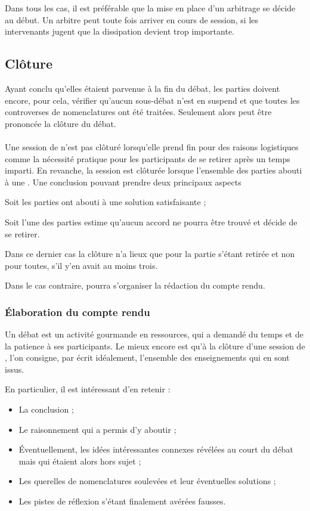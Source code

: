 Dans tous les cas, il est préférable que la mise en place d’un arbitrage se décide au début. Un arbitre peut toute fois arriver en cours de session, si les intervenants jugent que la dissipation devient trop importante.

\subsection{Clôture}

Ayant conclu qu’elles étaient parvenue à la fin du débat, les parties doivent encore, pour cela, vérifier qu’aucun sous-débat n’est en suspend et que toutes les controverses de nomenclatures ont été traitées. Seulement alors peut être prononcée la clôture du débat.

\paragraph{}
Une session de \mainabbr{} n’est pas clôturé lorsqu’elle prend fin pour des raisons logistiques comme la nécessité pratique pour les participants de se retirer après un temps imparti. En revanche, la session est clôturée lorsque l’ensemble des parties abouti à une . Une conclusion pouvant prendre deux principaux aspects
\begin{SRlist}
  \item Soit les parties ont abouti à une solution satisfaisante ;
  \item Soit l’une des parties estime qu’aucun accord ne pourra être trouvé et décide de se retirer.
\end{SRlist}
Dans ce dernier cas la clôture n’a lieux que pour la partie s’étant retirée et non pour toutes, s’il y’en avait au moins trois.

Dans le cas contraire, pourra s’organiser la rédaction du compte rendu.

\subsubsection{Élaboration du compte rendu}
Un débat est un activité gourmande en ressources, qui a demandé du temps et de la patience à ses participants. Le mieux encore est qu’à la clôture d’une session de \mainabbr{}, l’on consigne, par écrit idéalement, l’ensemble des enseignements qui en sont issus.

En particulier, il est intéressant d’en retenir :
\begin{itemize}
   \item La conclusion ;
   \item Le raisonnement qui a permis d’y aboutir ;
   \item Éventuellement, les idées intéressantes connexes révélées au court du débat mais qui étaient alors hors sujet ;
   \item Les querelles de nomenclatures soulevées et leur éventuelles solutions ;
   \item Les pistes de réflexion s’étant finalement avérées fausses.
\end{itemize}

